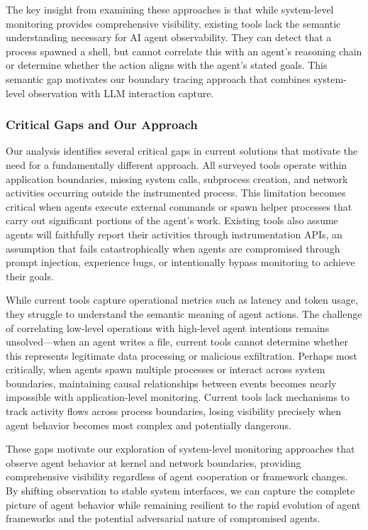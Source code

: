 The key insight from examining these approaches is that while system-level monitoring provides comprehensive visibility, existing tools lack the semantic understanding necessary for AI agent observability. They can detect that a process spawned a shell, but cannot correlate this with an agent's reasoning chain or determine whether the action aligns with the agent's stated goals. This semantic gap motivates our boundary tracing approach that combines system-level observation with LLM interaction capture.

\subsubsection{Critical Gaps and Our Approach}

Our analysis identifies several critical gaps in current solutions that motivate the need for a fundamentally different approach. All surveyed tools operate within application boundaries, missing system calls, subprocess creation, and network activities occurring outside the instrumented process. This limitation becomes critical when agents execute external commands or spawn helper processes that carry out significant portions of the agent's work. Existing tools also assume agents will faithfully report their activities through instrumentation APIs, an assumption that fails catastrophically when agents are compromised through prompt injection, experience bugs, or intentionally bypass monitoring to achieve their goals.

While current tools capture operational metrics such as latency and token usage, they struggle to understand the semantic meaning of agent actions. The challenge of correlating low-level operations with high-level agent intentions remains unsolved—when an agent writes a file, current tools cannot determine whether this represents legitimate data processing or malicious exfiltration. Perhaps most critically, when agents spawn multiple processes or interact across system boundaries, maintaining causal relationships between events becomes nearly impossible with application-level monitoring. Current tools lack mechanisms to track activity flows across process boundaries, losing visibility precisely when agent behavior becomes most complex and potentially dangerous.

These gaps motivate our exploration of system-level monitoring approaches that observe agent behavior at kernel and network boundaries, providing comprehensive visibility regardless of agent cooperation or framework changes. By shifting observation to stable system interfaces, we can capture the complete picture of agent behavior while remaining resilient to the rapid evolution of agent frameworks and the potential adversarial nature of compromised agents.